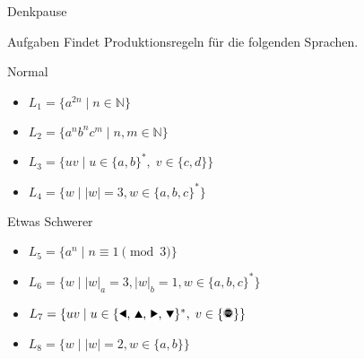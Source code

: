 {
\begin{frame}{Denkpause}
    \begin{alertblock}{Aufgaben}
    Findet Produktionsregeln für die folgenden Sprachen.
    \end{alertblock}
    \begin{block}{Normal}
    \begin{itemize}
        \item $L_1 = \{a^{2n} \mid n\in\mathbb{N}\}$
        \item $L_2 = \{a^nb^nc^m \mid n, m\in\mathbb{N}\}$
        \item $L_3 = \{uv \mid u\in\{a,b\}^\ast,\;v\in\{c,d\}\}$
        \item $L_4 = \{w \mid |w| = 3, w\in \{a,b,c\}^*\}$
    \end{itemize}
    \end{block}
    \begin{block}{Etwas Schwerer}
    \begin{itemize}
        \item $L_5 = \{a^n \mid n \equiv 1 \pmod 3\}$
        \item $L_6 = \{w \mid |w|_a = 3, |w|_b = 1, w\in \{a,b,c\}^*\}$
        \item $L_7 = \{uv \mid u\in\{\text{\Rewind, \MoveUp, \Forward, \MoveDown}\}^\ast,\;v\in\{\text{\Stopsign}\}\}$
        \item $L_8 = \{w\mid |w|=2, w \in \{a, b\}\}$
    \end{itemize}
    \end{block}
\end{frame}
}

